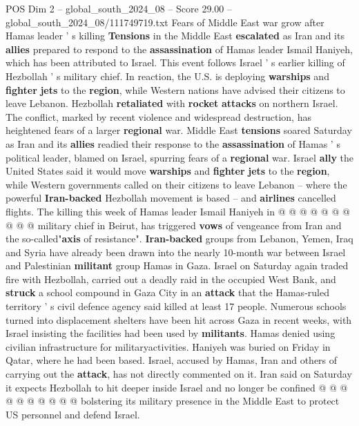 \begin{textsample}{POS Dim 2 – global\_south\_2024\_08 – Score 29.00 – global\_south\_2024\_08/111749719.txt}  \label{ex:f2_pos_017}
Fears of Middle East war grow after Hamas leader ' s killing \textbf{Tensions} in the Middle East \textbf{escalated} as Iran and its \textbf{allies} prepared to respond to the \textbf{assassination} of Hamas leader Ismail Haniyeh, which has been attributed to Israel.
This event follows Israel ' s earlier killing of Hezbollah ' s military chief.
In reaction, the U.S. is deploying \textbf{warships} and \textbf{fighter} \textbf{jets} to the \textbf{region}, while Western nations have advised their citizens to leave Lebanon.
Hezbollah \textbf{retaliated} with \textbf{rocket} \textbf{attacks} on northern Israel.
The conflict, marked by recent violence and widespread destruction, has heightened fears of a larger \textbf{regional} war.
Middle East \textbf{tensions} soared Saturday as Iran and its \textbf{allies} readied their response to the \textbf{assassination} of Hamas ' s political leader, blamed on Israel, spurring fears of a \textbf{regional} war.
Israel \textbf{ally} the United States said it would move \textbf{warships} and \textbf{fighter} \textbf{jets} to the \textbf{region}, while Western governments called on their citizens to leave Lebanon -- where the powerful \textbf{Iran-backed} Hezbollah movement is based -- and \textbf{airlines} cancelled flights.
The killing this week of Hamas leader Ismail Haniyeh in @ @ @ @ @ @ @ @ @ @ military chief in Beirut, has triggered \textbf{vows} of vengeance from Iran and the so-called"\textbf{axis} of resistance". \textbf{Iran-backed} groups from Lebanon, Yemen, Iraq and Syria have already been drawn into the nearly 10-month war between Israel and Palestinian \textbf{militant} group Hamas in Gaza.
Israel on Saturday again traded fire with Hezbollah, carried out a deadly raid in the occupied West Bank, and \textbf{struck} a school compound in Gaza City in an \textbf{attack} that the Hamas-ruled territory ' s civil defence agency said killed at least 17 people.
Numerous schools turned into displacement shelters have been hit across Gaza in recent weeks, with Israel insisting the facilities had been used by \textbf{militants}.
Hamas denied using civilian infrastructure for militaryactivities.
Haniyeh was buried on Friday in Qatar, where he had been based.
Israel, accused by Hamas, Iran and others of carrying out the \textbf{attack}, has not directly commented on it.
Iran said on Saturday it expects Hezbollah to hit deeper inside Israel and no longer be confined @ @ @ @ @ @ @ @ @ @ bolstering its military presence in the Middle East to protect US personnel and defend Israel.

\end{textsample}
